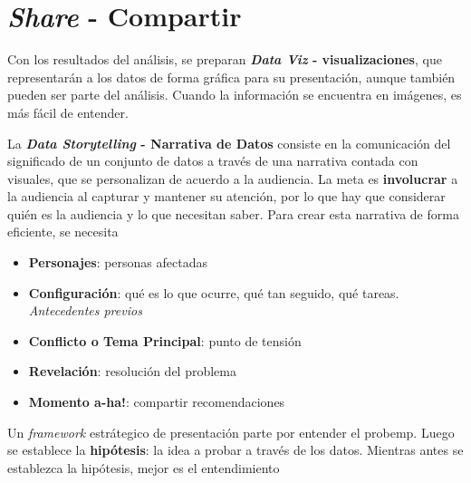
\section{\textit{Share} - Compartir}
Con los resultados del análisis, se preparan \textbf{\textit{Data Viz} - visualizaciones}, que representarán a los datos de forma gráfica para su presentación, aunque también pueden ser parte del análisis. Cuando la información se encuentra en imágenes, es más fácil de entender. 

La \textbf{\textit{Data Storytelling} - Narrativa de Datos} consiste en la comunicación del significado de un conjunto de datos a través de una narrativa contada con visuales, que se personalizan de acuerdo a la audiencia. La meta es \textbf{involucrar} a la audiencia al capturar y mantener su atención, por lo que hay que considerar quién es la audiencia y lo que necesitan saber. Para crear esta narrativa de forma eficiente, se necesita
\begin{itemize}
    \item {\textbf{Personajes}: personas afectadas}
    \item {\textbf{Configuración}: qué es lo que ocurre, qué tan seguido, qué tareas. \textit{Antecedentes previos}}
    \item {\textbf{Conflicto o Tema Principal}: punto de tensión}
    \item {\textbf{Revelación}: resolución del problema}
    \item {\textbf{Momento a-ha!}: compartir recomendaciones}
\end{itemize}
Un \textit{framework} estrátegico de presentación parte por entender el \gls{probemp}. Luego se establece la \textbf{hipótesis}: la idea a probar a través de los datos. Mientras antes se establezca la hipótesis, mejor es el entendimiento



